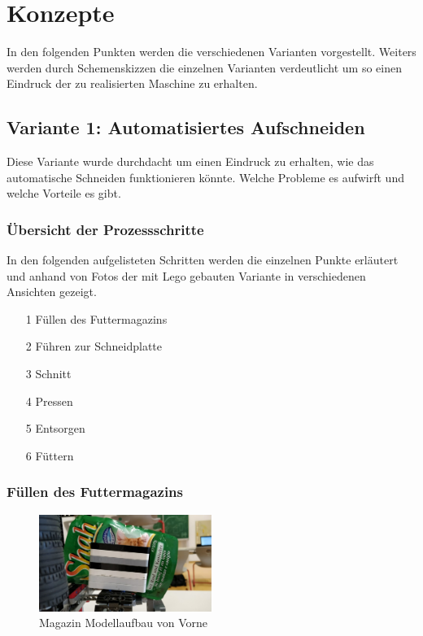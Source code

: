 \section{Konzepte} 

In den folgenden Punkten werden die verschiedenen Varianten vorgestellt. Weiters werden durch Schemenskizzen die einzelnen Varianten verdeutlicht um so einen Eindruck der zu realisierten Maschine zu erhalten.

\subsection{Variante 1: Automatisiertes Aufschneiden} 

Diese Variante wurde durchdacht um einen Eindruck zu erhalten, wie das automatische Schneiden funktionieren könnte. Welche Probleme es aufwirft und welche Vorteile es gibt.

\subsubsection{Übersicht der Prozessschritte}

In den folgenden aufgelisteten Schritten werden die einzelnen Punkte erläutert und anhand von Fotos der mit Lego gebauten Variante in verschiedenen Ansichten gezeigt.

\begin{itemize}
\item[1] Füllen des Futtermagazins
\item[2] Führen zur Schneidplatte
\item[3] Schnitt
\item[4] Pressen
\item[5] Entsorgen
\item[6] Füttern
\end{itemize}

\newpage

\subsubsection{Füllen des Futtermagazins}


\begin{figure}
\vspace{-30pt}
  \begin{center}
    \includegraphics[width=0.50\textwidth]{Bilder/Ablauf_1_png/Magazin_Vorne}
  \end{center}
  \caption{Magazin Modellaufbau von Vorne}
  \label{Magazin Vorne}
  \vspace{-10pt}
\end{figure}

